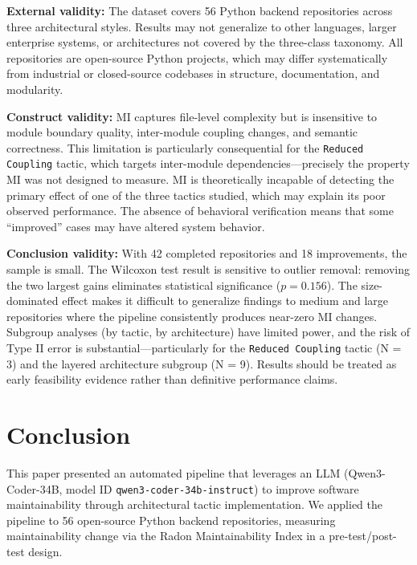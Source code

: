 \documentclass[sigconf,review,anonymous]{acmart}
\begin{document}
\textbf{External validity:} The dataset covers 56 Python backend repositories across three architectural styles. Results may not generalize to other languages, larger enterprise systems, or architectures not covered by the three-class taxonomy. All repositories are open-source Python projects, which may differ systematically from industrial or closed-source codebases in structure, documentation, and modularity.

\textbf{Construct validity:} MI captures file-level complexity but is insensitive to module boundary quality, inter-module coupling changes, and semantic correctness. This limitation is particularly consequential for the \texttt{Reduced Coupling} tactic, which targets inter-module dependencies---precisely the property MI was not designed to measure. MI is theoretically incapable of detecting the primary effect of one of the three tactics studied, which may explain its poor observed performance. The absence of behavioral verification means that some ``improved'' cases may have altered system behavior.

\textbf{Conclusion validity:} With 42 completed repositories and 18 improvements, the sample is small. The Wilcoxon test result is sensitive to outlier removal: removing the two largest gains eliminates statistical significance ($p = 0.156$). The size-dominated effect makes it difficult to generalize findings to medium and large repositories where the pipeline consistently produces near-zero MI changes. Subgroup analyses (by tactic, by architecture) have limited power, and the risk of Type II error is substantial---particularly for the \texttt{Reduced Coupling} tactic (N = 3) and the layered architecture subgroup (N = 9). Results should be treated as early feasibility evidence rather than definitive performance claims.


\section{Conclusion}
\label{sec:conclusion}

This paper presented an automated pipeline that leverages an LLM (Qwen3-Coder-34B, model ID \texttt{qwen3-coder-34b-instruct}) to improve software maintainability through architectural tactic implementation. We applied the pipeline to 56 open-source Python backend repositories, measuring maintainability change via the Radon Maintainability Index in a pre-test/post-test design.
\end{document}
